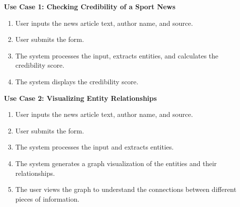 \documentclass[11pt]{article}
\begin{document}
\textbf{Use Case 1: Checking Credibility of a Sport News}
\begin{enumerate}
    \item User inputs the news article text, author name, and source.
    \item User submits the form.
    \item The system processes the input, extracts entities, and calculates the credibility score.
    \item The system displays the credibility score.
\end{enumerate}

\textbf{Use Case 2: Visualizing Entity Relationships}
\begin{enumerate}
    \item User inputs the news article text, author name, and source.
    \item User submits the form.
    \item The system processes the input and extracts entities.
    \item The system generates a graph visualization of the entities and their relationships.
    \item The user views the graph to understand the connections between different pieces of information.
\end{enumerate}
\end{document}
